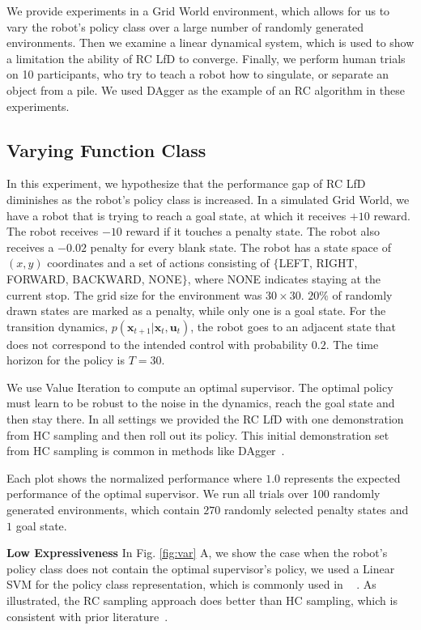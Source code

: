 \documentclass[10pt, conference]{ieeeconf}      %
\newcommand{\bu}{\mathbf{u}}
\newcommand{\bx}{\mathbf{x}}
\begin{document}
We provide experiments in a  Grid World environment, which allows for us to vary the robot's policy class over a large number of randomly generated environments. Then we examine a linear dynamical system, which is used to show a limitation the ability of RC LfD to converge. Finally, we perform human trials on 10 participants, who try to teach a robot how to singulate, or separate an object from a pile. We used DAgger as the example of an RC algorithm in these experiments. 

\subsection{Varying Function Class}\label{sec:gdw}
In this experiment, we hypothesize that the performance gap of RC LfD diminishes as the robot's policy class is increased. In a simulated Grid World, we have a robot that is trying to reach a goal state, at which it receives $+10$ reward. The robot receives $-10$ reward if it touches a penalty state. The robot also receives a $-0.02$ penalty for every blank state. The robot has a state space of $(x,y)$ coordinates and a set of actions consisting of $\lbrace$LEFT, RIGHT, FORWARD, BACKWARD, NONE$\rbrace$, where NONE indicates staying at the current stop. The grid size for the environment was $30 \times 30$. $20\%$ of randomly drawn states are marked as a penalty, while only one is a goal state. For the transition dynamics, $p(\bx_{t+1}|\bx_{t},\bu_t)$, the robot goes to an adjacent state that does not correspond to the intended control with probability $0.2$.  The time horizon for the policy is $T=30$. 

We use Value Iteration to compute an optimal supervisor. The optimal policy must learn to be robust to the noise in the dynamics, reach the goal state and then stay there. In all settings we provided the RC LfD with one demonstration from HC sampling and then roll out its policy. This initial demonstration set from HC sampling is common in methods like DAgger~\cite{rossreduction2010}.

Each plot shows the normalized performance where $1.0$ represents the expected performance of the optimal supervisor. We run all trials over 100 randomly generated environments, which contain $270$ randomly selected penalty states and $1$ goal state. 


\noindent \textbf{Low Expressiveness} In Fig. \ref{fig:var} A, we show the case when the robot's policy class does not contain the optimal supervisor's policy, we used a Linear SVM for the policy class representation, which is commonly used in ~\cite{ross2010efficient,ross2010reduction,ross2013learning} . As illustrated, the RC sampling approach does better than HC sampling, which is consistent with prior literature~\cite{ross2010efficient,ross2010reduction}.
\end{document}
